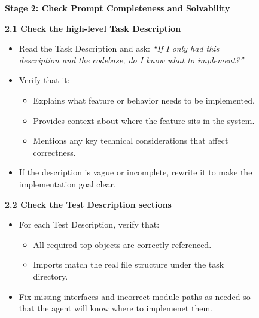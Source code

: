 \documentclass{article}
\begin{document}
\begin{figure}[t]
\centering
\begin{tcolorbox}[
    colback=white,
    colframe=black!60,
    colbacktitle=black!60,
    coltitle=white,
    title=Expert Verification Guideline for Feature-Level Tasks (part 2 of 2),
    fonttitle=\bfseries,
    boxrule=0.7pt,
    arc=1mm,
    width=0.98\linewidth
]


\textbf{Stage 2: Check Prompt Completeness and Solvability}

\textbf{2.1 Check the high-level Task Description}
\begin{itemize}
    \item Read the Task Description and ask:
    \emph{“If I only had this description and the codebase, do I know what to implement?”}
    \item Verify that it:
    \begin{itemize}
        \item Explains what feature or behavior needs to be implemented.
        \item Provides context about where the feature sits in the system.
        \item Mentions any key technical considerations that affect correctness.
    \end{itemize}
    \item If the description is vague or incomplete, rewrite it to make the implementation goal clear.
\end{itemize}

\textbf{2.2 Check the Test Description sections}
\begin{itemize}
    \item For each Test Description, verify that:
    \begin{itemize}
        \item All required top objects are correctly referenced.
        \item Imports match the real file structure under the task directory.
    \end{itemize}
    \item Fix missing interfaces and incorrect module paths as needed so that the agent will know where to implemenet them.
\end{itemize}


\end{tcolorbox}
\end{figure}
\end{document}
